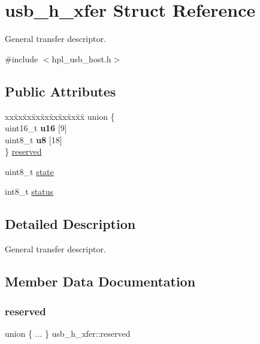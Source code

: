 \hypertarget{structusb__h__xfer}{}\section{usb\+\_\+h\+\_\+xfer Struct Reference}
\label{structusb__h__xfer}


General transfer descriptor.  




{\ttfamily \#include $<$hpl\+\_\+usb\+\_\+host.\+h$>$}

\subsection*{Public Attributes}
\begin{DoxyCompactItemize}
\item 
\begin{tabbing}
xx\=xx\=xx\=xx\=xx\=xx\=xx\=xx\=xx\=\kill
union \{\\
\>uint16\_t {\bfseries u16} \mbox{[}9\mbox{]}\\
\>uint8\_t {\bfseries u8} \mbox{[}18\mbox{]}\\
\} \hyperlink{structusb__h__xfer_abf28abad782a49b46036bb6f5aa8a0bf}{reserved}\\

\end{tabbing}\item 
uint8\+\_\+t \hyperlink{structusb__h__xfer_a6beff3569ca236c435297860e7d73865}{state}
\item 
int8\+\_\+t \hyperlink{structusb__h__xfer_ada2ac9bb01c2a37045d9b69c3762e02c}{status}
\end{DoxyCompactItemize}


\subsection{Detailed Description}
General transfer descriptor. 

\subsection{Member Data Documentation}
\mbox{\label{structusb__h__xfer_abf28abad782a49b46036bb6f5aa8a0bf}} 
\subsubsection{\texorpdfstring{reserved}{reserved}}
{\footnotesize\ttfamily union \{ ... \}   usb\+\_\+h\+\_\+xfer\+::reserved}

